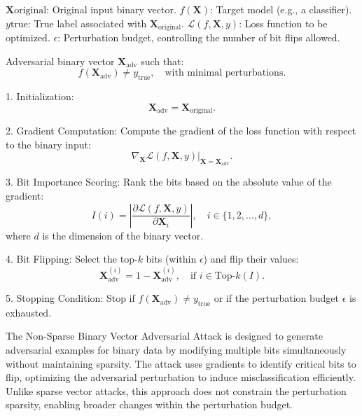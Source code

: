 
$\mathbf{X}{\text{original}}$: Original input binary vector.
$f(\mathbf{X})$: Target model (e.g., a classifier).
$y{\text{true}}$: True label associated with $\mathbf{X}_{\text{original}}$.
$\mathcal{L}(f, \mathbf{X}, y)$: Loss function to be optimized.
$\epsilon$: Perturbation budget, controlling the number of bit flips allowed.

Adversarial binary vector $\mathbf{X}_{\text{adv}}$ such that:  
\[
f(\mathbf{X}_{\text{adv}}) \neq y_{\text{true}}, \quad \text{with minimal perturbations}.
\]

1. Initialization:  
   \[
   \mathbf{X}_{\text{adv}} = \mathbf{X}_{\text{original}}.
   \]

2. Gradient Computation:  
   Compute the gradient of the loss function with respect to the binary input:  
   \[
   \nabla_{\mathbf{X}} \mathcal{L}(f, \mathbf{X}, y) \big|_{\mathbf{X} = \mathbf{X}_{\text{adv}}}.
   \]

3. Bit Importance Scoring:  
   Rank the bits based on the absolute value of the gradient:  
   \[
   I(i) = \left| \frac{\partial \mathcal{L}(f, \mathbf{X}, y)}{\partial \mathbf{X}_i} \right|, \quad i \in \{1, 2, \ldots, d\},
   \]
   where $d$ is the dimension of the binary vector.

4. Bit Flipping:  
   Select the top-$k$ bits (within $\epsilon$) and flip their values:  
   \[
   \mathbf{X}_{\text{adv}}^{(i)} = 1 - \mathbf{X}_{\text{adv}}^{(i)}, \quad \text{if } i \in \text{Top-}k(I).
   \]

5. Stopping Condition:  
   Stop if $f(\mathbf{X}_{\text{adv}}) \neq y_{\text{true}}$ or if the perturbation budget $\epsilon$ is exhausted.

The Non-Sparse Binary Vector Adversarial Attack is designed to generate adversarial examples for binary data by modifying multiple bits simultaneously without maintaining sparsity. The attack uses gradients to identify critical bits to flip, optimizing the adversarial perturbation to induce misclassification efficiently. Unlike sparse vector attacks, this approach does not constrain the perturbation sparsity, enabling broader changes within the perturbation budget.